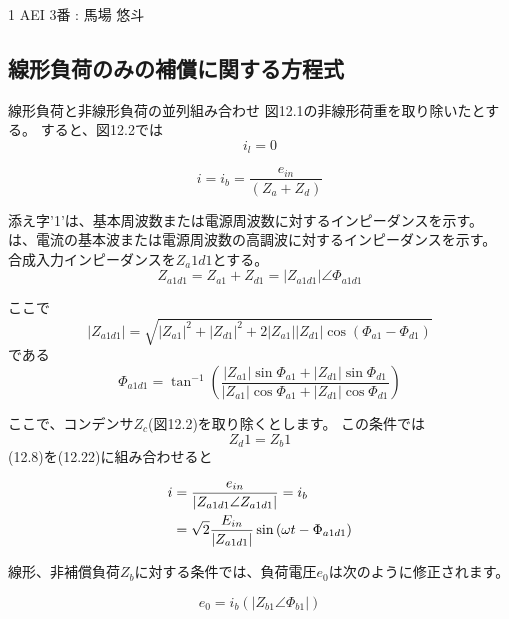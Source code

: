 \documentclass[fleqn,11pt,a4paper,dvipdfmx]{jsarticle}
\numberwithin{equation}{section}
\begin{document}
%
%
1 AEI 3番 : 馬場 悠斗
\setcounter{section}{12}
\subsection{線形負荷のみの補償に関する方程式}

線形負荷と非線形負荷の並列組み合わせ
図12.1の非線形荷重を取り除いたとする。
すると、図12.2では
\begin{equation}
  i_l = 0
\end{equation}

\begin{equation}
  i = i_b = \frac{e_{in}}{\left(Z_a + Z_d\right)}
\end{equation}

添え字'1'は、基本周波数または電源周波数に対するインピーダンスを示す。
は、電流の基本波または電源周波数の高調波に対するインピーダンスを示す。
合成入力インピーダンスを$Z_a1d1$とする。
\begin{equation}
  Z_{a1d1} = Z_{a1} + Z_{d1} = |Z_{a1d1}| \angle \Phi_{a1d1}
\end{equation}

ここで
\begin{equation}
  |Z_{a1d1}| = \sqrt{|Z_{a1}|^2 + |Z_{d1}|^2 + 2|Z_{a1}||Z_{d1}| \cos \left(\Phi_{a1} - \Phi_{d1}\right) }
\end{equation}
である
\begin{equation}
  \Phi_{a1d1} = \tan^{-1}\left( \frac{\left| Z_{a1} \right| \sin \Phi_{a1} + \left| Z_{d1} \right| \sin \Phi_{d1} }{\left| Z_{a1} \right| \cos \Phi_{a1} + \left| Z_{d1} \right| \cos \Phi_{d1}}\right)
\end{equation}

ここで、コンデンサ$Z_c$(図12.2)を取り除くとします。
この条件では
\begin{equation}
  Z_d1 = Z_b1
\end{equation}
(12.8)を(12.22)に組み合わせると

\begin{align}
  i & = \frac{e_{in}}{\left| Z_{a1d1}\angle Z_{a1d1} \right|} = i_b \notag                     \\
    & = \sqrt{2} \frac{E_{in}}{\left|Z_{a1d1}\right|} \sin \left(\omega t - \Phi_{a1d1}\right)
\end{align}

線形、非補償負荷$Z_b$に対する条件では、負荷電圧$e_0$は次のように修正されます。

\begin{equation}
  e_0 = i_b \left(\left|Z_{b1} \angle \Phi_{b1}\right|\right)
\end{equation}
\end{document}
